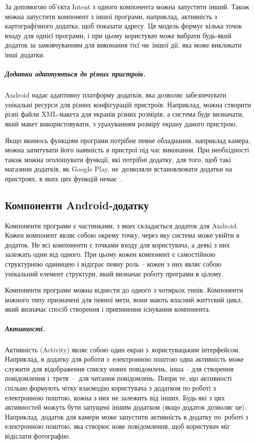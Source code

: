 \documentclass[../main.tex]{subfiles}
\begin{document}
За допомогою об'єкта Intent з одного компонента можна запустити інший. Також можна запустити компонент з іншої програми, наприклад, активність з картографічного додатка, щоб показати адресу. Ця модель формує кілька точок входу для однієї програми, і при цьому користувач може вибрати будь-який додаток за замовчуванням для виконання тієї чи~іншої дії, яка може викликати інші додатки.
	
\subparagraph{Додатки адаптуються до різних пристроїв.}
Android надає адаптивну платформу додатків, яка дозволяє забезпечувати унікальні ресурси для різних конфігурацій пристроїв. Наприклад, можна створити різні файли \mbox{XML-макета} для екранів різних розмірів, а система буде визначати, який макет використовувати, з урахуванням розміру екрану даного пристрою.

Якщо якимось функціям програми потрібне певне обладнання, наприклад камера, можна запитувати його наявність в пристрої під час виконання. При необхідності також можна оголошувати функції, які потрібні додатку, для того, щоб такі магазини додатків, як Google Play, не~дозволяли встановлювати додатки на пристроях, в яких цих функцій немає~\cite{android_4}.

\subsection{Компоненти Android-додатку}

Компоненти програми є частинками, з яких складається додаток для Android. Кожен компонент являє собою окрему точку, через яку система може увійти в додаток. Не всі компоненти є точками входу для користувача, а деякі з них залежать один від одного. При цьому кожен компонент є самостійною структурною одиницею і відіграє певну роль -- кожен з них являє собою унікальний елемент структури, який визначає роботу програми в цілому.

Компоненти програми можна віднести до одного з чотирьох типів. Компоненти кожного типу призначені для певної мети, вони мають власний життєвий цикл, який визначає спосіб створення і припинення існування компонента.

\subparagraph{Активності.}
Активність (Activity) являє собою один екран з~користувацьким інтерфейсом. Наприклад, в додатку для роботи з~електронною поштою одна активність може служити для відображення списку нових повідомлень, інша -- для створення повідомлення і~третя~--~для читання повідомлень. Попри те, що активності спільно формують чітку взаємодію користувача з додатком по роботі з електронною поштою, кожна з них не залежить від інших. Будь-які з цих активностей можуть бути запущені іншим додатком (якщо додаток дозволяє це). Наприклад, додаток для камери може запустити активність в додатку по~роботі з електронною поштою, яка створює нове повідомлення, щоб користувач міг відіслати фотографію.
\end{document}
